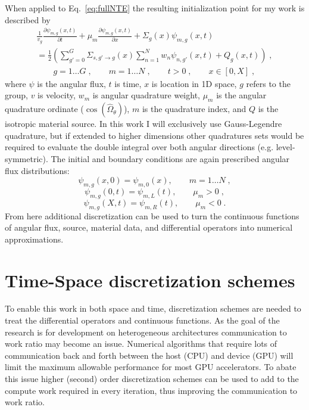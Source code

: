 When applied to Eq.~\eqref{eq:fullNTE} the resulting initialization point for my work is described by
\begin{multline}
    \label{sn_nte_int}
    \frac{1}{v_g} \frac{\partial \psi_{m,g}(x,t)}{\partial t} + \mu_m \frac{\partial \psi_{m,g}(x,t)}{\partial x} + \Sigma_g(x) \psi_{m,g}(x,t)  \\
     = \frac{1}{2} \left( \sum\limits_{g' = 0}^G \Sigma_{s, g'\to g}(x) \sum\limits_{n=1}^N w_n \psi_{n, g'}(x,t) + Q_g(x,t) \right) \;, \\
    \qquad g=1 \ldots G \;, \qquad m=1 \ldots N \;, \qquad t > 0 \;, \qquad x \in [0,X] \;,
\end{multline}
where $\psi$ is the angular flux, $t$ is time, $x$ is location in 1D space, $g$ refers to the group, $v$ is velocity, $w_m$ is angular quadrature weight, $\mu_m$ is the angular quadrature ordinate ($\cos(\hat{\Omega}_\theta)$), $m$ is the quadrature index, and $Q$ is the isotropic material source.
In this work I will exclusively use Gauss-Legendre quadrature, but if extended to higher dimensions other quadratures sets would be required to evaluate the double integral over both angular directions (e.g. level-symmetric). 
The initial and boundary conditions are again prescribed angular flux distributions:
\begin{equation*}
    \psi_{m,g}(x,0) = \psi_{m,0}(x), \qquad m=1 \ldots N \;,
\end{equation*}
\begin{equation*}
    \psi_{m,g}(0,t) = \psi_{m,L}(t), \qquad \mu_m >0 \;,
\end{equation*}
\begin{equation*}
    \psi_{m,g}(X,t) = \psi_{m,R}(t), \qquad \mu_m <0 \;.
\end{equation*}
From here additional discretization can be used to turn the continuous functions of angular flux, source, material data, and differential operators into numerical approximations.

\section{Time-Space discretization schemes}

To enable this work in both space and time, discretization schemes are needed to treat the differential operators and continuous functions.
As the goal of the research is for development on heterogeneous architectures communication to work ratio may become an issue.
Numerical algorithms that require lots of communication back and forth between the host (CPU) and device (GPU) will limit the maximum allowable performance for most GPU accelerators.
To abate this issue higher (second) order discretization schemes can be used to add to the compute work required in every iteration, thus improving the communication to work ratio.

